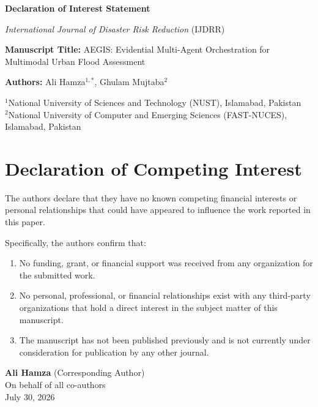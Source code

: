 \documentclass[11pt,a4paper]{article}
\begin{document}
\thispagestyle{empty}

\begin{center}
{\Large \bf Declaration of Interest Statement \par}
\vspace{0.5em}
{\large \textit{International Journal of Disaster Risk Reduction} (IJDRR) \par}
\end{center}

\vspace{2em}

\noindent \textbf{Manuscript Title:} AEGIS: Evidential Multi-Agent Orchestration for Multimodal Urban Flood Assessment

\vspace{1.5em}

\noindent \textbf{Authors:} Ali Hamza$^{1,*}$, Ghulam Mujtaba$^2$

\vspace{1em}

\noindent $^1$National University of Sciences and Technology (NUST), Islamabad, Pakistan \\
$^2$National University of Computer and Emerging Sciences (FAST-NUCES), Islamabad, Pakistan

\vspace{2em}

\section*{Declaration of Competing Interest}

\noindent The authors declare that they have no known competing financial interests or personal relationships that could have appeared to influence the work reported in this paper.

\vspace{1.5em}

\noindent Specifically, the authors confirm that:
\begin{enumerate}
    \item No funding, grant, or financial support was received from any organization for the submitted work.
    \item No personal, professional, or financial relationships exist with any third-party organizations that hold a direct interest in the subject matter of this manuscript.
    \item The manuscript has not been published previously and is not currently under consideration for publication by any other journal.
\end{enumerate}

\vspace{3em}

\begin{flushleft}
\textbf{Ali Hamza} (Corresponding Author) \\
On behalf of all co-authors \\
July 30, 2026
\end{flushleft}
\end{document}

